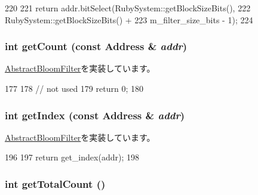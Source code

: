 \begin{DoxyCode}
220 {
221     return addr.bitSelect(RubySystem::getBlockSizeBits(),
222                           RubySystem::getBlockSizeBits() +
223                           m_filter_size_bits - 1);
224 }
\end{DoxyCode}
\hypertarget{classBulkBloomFilter_abb722634d5846105b673e9496df8d062}{
\subsubsection[{getCount}]{\setlength{\rightskip}{0pt plus 5cm}int getCount (const {\bf Address} \& {\em addr})}}
\label{classBulkBloomFilter_abb722634d5846105b673e9496df8d062}


\hyperlink{classAbstractBloomFilter_ab6253919ea6ff1b2c17506742b34147d}{AbstractBloomFilter}を実装しています。


\begin{DoxyCode}
177 {
178     // not used
179     return 0;
180 }
\end{DoxyCode}
\hypertarget{classBulkBloomFilter_a19f42f6f2fc3501021b768f0df8108b2}{
\subsubsection[{getIndex}]{\setlength{\rightskip}{0pt plus 5cm}int getIndex (const {\bf Address} \& {\em addr})}}
\label{classBulkBloomFilter_a19f42f6f2fc3501021b768f0df8108b2}


\hyperlink{classAbstractBloomFilter_a4dd174ae24a8237d41cf0b02c78b896d}{AbstractBloomFilter}を実装しています。


\begin{DoxyCode}
196 {
197     return get_index(addr);
198 }
\end{DoxyCode}
\hypertarget{classBulkBloomFilter_a97f66183ea41a7c123bab9dd5313a74a}{
\subsubsection[{getTotalCount}]{\setlength{\rightskip}{0pt plus 5cm}int getTotalCount ()}}
\label{classBulkBloomFilter_a97f66183ea41a7c123bab9dd5313a74a}


